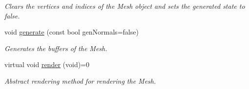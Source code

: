 \begin{DoxyCompactItemize}
\begin{DoxyCompactList}\small\item\em Clears the vertices and indices of the Mesh object and sets the generated state to false. \end{DoxyCompactList}\item 
void \hyperlink{classsparky_1_1_i_mesh_component_abad2c646e2303e5f69d1fc5efcb7f2c7}{generate} (const bool gen\+Normals=false)
\begin{DoxyCompactList}\small\item\em Generates the buffers of the Mesh. \end{DoxyCompactList}\item 
virtual void \hyperlink{classsparky_1_1_i_mesh_component_abd7ed95f1885252305a16f2c97b8ed48}{render} (void)=0
\begin{DoxyCompactList}\small\item\em Abstract rendering method for rendering the Mesh. \end{DoxyCompactList}\end{DoxyCompactItemize}
